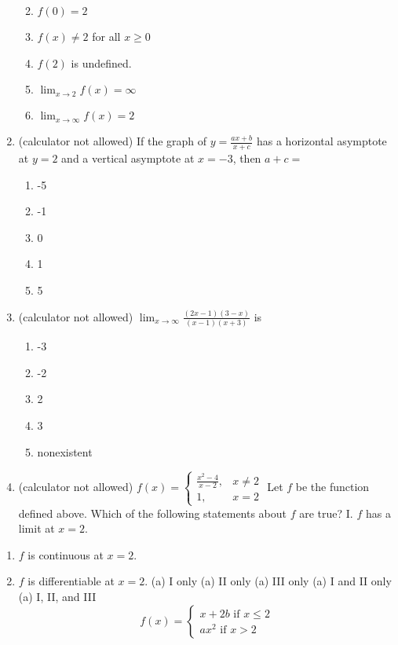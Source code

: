 \documentclass[
]{article}
\providecommand{\tightlist}{%
  \setlength{\itemsep}{0pt}\setlength{\parskip}{0pt}}
\begin{document}
\begin{enumerate}
  \begin{enumerate}
  \def\labelenumii{(\alph{enumii})}
  \tightlist
  \item
    \(f(0)=2\)
  \item
    \(f(x) \neq 2\) for all \(x \geq 0\)
  \item
    \(f(2)\) is undefined.
  \item
    \(\lim _{x \rightarrow 2} f(x)=\infty\)
  \item
    \(\lim _{x \rightarrow \infty} f(x)=2\)
  \end{enumerate}
\item
  (calculator not allowed) If the graph of \(y=\frac{a x+b}{x+c}\) has a
  horizontal asymptote at \(y=2\) and a vertical asymptote at \(x=-3\),
  then \(a+c=\)

  \begin{enumerate}
  \def\labelenumii{(\alph{enumii})}
  \tightlist
  \item
    -5
  \item
    -1
  \item
    0
  \item
    1
  \item
    5
  \end{enumerate}
\item
  (calculator not allowed)
  \(\lim _{x \rightarrow \infty} \frac{(2 x-1)(3-x)}{(x-1)(x+3)}\) is

  \begin{enumerate}
  \def\labelenumii{(\alph{enumii})}
  \tightlist
  \item
    -3
  \item
    -2
  \item
    2
  \item
    3
  \item
    nonexistent
  \end{enumerate}
\item
  (calculator not allowed)
  \(f(x)=\left\{\begin{array}{cc}\frac{x^{2}-4}{x-2}, & x \neq 2 \\ 1, & x=2\end{array}\right.\)
  Let \(f\) be the function defined above. Which of the following
  statements about \(f\) are true? I. \(f\) has a limit at \(x=2\).
\end{enumerate}

\begin{enumerate}
\def\labelenumi{\Roman{enumi}.}
\setcounter{enumi}{1}
\tightlist
\item
  \(f\) is continuous at \(x=2\).
\item
  \(f\) is differentiable at \(x=2\). (a) I only (a) II only (a) III
  only (a) I and II only (a) I, II, and III
  \[f(x)=\left\{\begin{array}{l}
  x+2 b \text { if } x \leq 2 \\
  a x^{2} \text { if } x>2
  \end{array}\right.\]
\end{enumerate}
\end{document}
